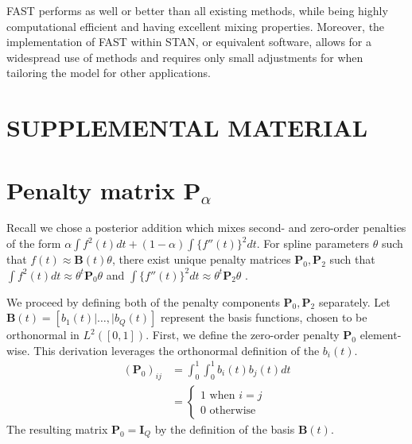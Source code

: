 \documentclass[12pt]{article}
\newcommand{\beginsupplement}{%
        \setcounter{section}{0}
        \renewcommand{\thesection}{S\arabic{section}}%
        \setcounter{table}{0}
        \renewcommand{\thetable}{S\arabic{table}}%
        \setcounter{figure}{0}
        \renewcommand{\thefigure}{S\arabic{figure}}%
     }
\begin{document}
FAST performs as well or better than all existing methods, while being highly computational efficient and having excellent mixing properties. Moreover, the implementation of FAST within {\ttfamily STAN}, or equivalent software, allows for a widespread use of methods and requires only small adjustments for when tailoring the model for other applications. 

\clearpage

\begin{singlespace}




\end{singlespace}

\pagebreak

\section*{SUPPLEMENTAL MATERIAL}
\beginsupplement

\section{Penalty matrix $\mathbf{P}_{\alpha}$}\label{supp:Penalty}

Recall we chose a posterior addition which mixes second- and zero-order penalties of the form $\alpha \int f^2(t) dt + (1-\alpha) \int \{f''(t)\}^2 dt$. For spline parameters $\theta$ such that $f(t) \approx \mathbf{B}(t)\theta$, there exist unique penalty matrices $\mathbf{P}_0, \mathbf{P}_2$ such that $\int f^2(t) dt \approx \theta^t \mathbf{P}_0\theta$ and $\int \{f''(t)\}^2 dt \approx \theta^t\mathbf{P}_2\theta$ \citep{cravenwahba1979,kimeldorfwahba1970,osullivan1986,Wahba1983}. 

We proceed by defining both of the penalty components $\mathbf{P}_0, \mathbf{P}_2$ separately. Let $\mathbf{B}(t) = [b_1(t)|\ldots,|b_Q(t)]$ represent the basis functions, chosen to be orthonormal in $L^2([0,1])$. First, we define the zero-order penalty $\mathbf{P}_0$ element-wise. This derivation leverages the orthonormal definition of the $b_i(t)$.
\begin{align*}
    (\mathbf{P}_0)_{ij} & = \int_0^1 \int_0^1 b_i(t) b_j(t) dt\\
    & = \begin{cases} 1 \text{ when } i = j\\
    0 \text{ otherwise} \end{cases}
\end{align*}
The resulting matrix $\mathbf{P}_0 = \mathbf{I}_Q$ by the definition of the basis $\mathbf{B}(t)$. 
\end{document}
